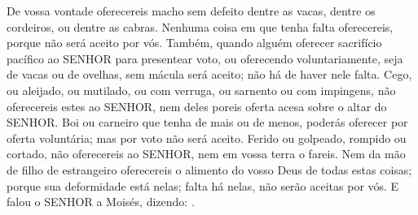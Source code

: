 {{{{  De vossa vontade oferecereis macho sem defeito dentre as vacas, dentre os cordeiros, ou dentre as cabras}}.
  Nenhuma coisa em que tenha falta oferecereis, porque não será aceito por vós.
  Também, quando alguém oferecer sacrifício pacífico ao SENHOR para presentear voto, ou oferecendo voluntariamente, seja de vacas ou de ovelhas, sem mácula será aceito; não há de haver nele falta.
  Cego, ou aleijado, ou mutilado, ou com verruga, ou sarnento ou com impingens, não oferecereis estes ao SENHOR, nem deles poreis oferta acesa sobre o altar do SENHOR.
  Boi ou carneiro que tenha de mais ou de menos, poderás oferecer por oferta voluntária; mas por voto não será aceito.
  Ferido ou golpeado, rompido ou cortado, não oferecereis ao SENHOR, nem em vossa terra o fareis.
  Nem da mão de filho de estrangeiro oferecereis o alimento do vosso Deus de todas estas coisas; porque sua deformidade está nelas; falta há nelas, não serão aceitas por vós}.
  E falou o SENHOR a Moisés, dizendo:
  .
\par }

